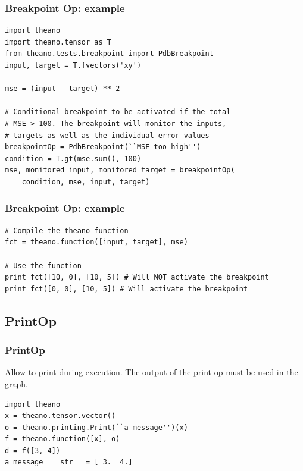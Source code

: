 \documentclass[utf8x,xcolor=pdftex,dvipsnames,table]{beamer}
\begin{document}
\begin{frame}[fragile]
  \frametitle{Breakpoint Op: example}
\begin{lstlisting}
import theano
import theano.tensor as T
from theano.tests.breakpoint import PdbBreakpoint
input, target = T.fvectors('xy')

mse = (input - target) ** 2

# Conditional breakpoint to be activated if the total
# MSE > 100. The breakpoint will monitor the inputs,
# targets as well as the individual error values
breakpointOp = PdbBreakpoint(``MSE too high'')
condition = T.gt(mse.sum(), 100)
mse, monitored_input, monitored_target = breakpointOp(
    condition, mse, input, target)
\end{lstlisting}
\end{frame}

\begin{frame}[fragile]
  \frametitle{Breakpoint Op: example}
\begin{lstlisting}
# Compile the theano function
fct = theano.function([input, target], mse)

# Use the function
print fct([10, 0], [10, 5]) # Will NOT activate the breakpoint
print fct([0, 0], [10, 5]) # Will activate the breakpoint
\end{lstlisting}

\end{frame}

\subsection{PrintOp}
\begin{frame}[fragile]
  \frametitle{PrintOp}
Allow to print during execution. The output of the print op must be
used in the graph.
 \vspace{1cm}
\begin{lstlisting}
import theano
x = theano.tensor.vector()
o = theano.printing.Print(``a message'')(x)
f = theano.function([x], o)
d = f([3, 4])
a message  __str__ = [ 3.  4.]
\end{lstlisting}
\end{frame}
\end{document}
